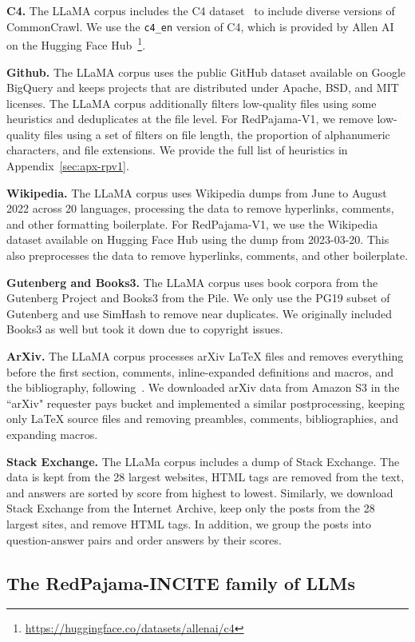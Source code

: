 \documentclass{article}
\begin{document}
{\bf C4.} The LLaMA corpus includes the C4 dataset~\cite{raffel2020exploring} to include diverse versions of CommonCrawl. We use the \texttt{c4\_en} version of C4, which is provided by Allen AI on the Hugging Face Hub~\footnote{\url{https://huggingface.co/datasets/allenai/c4}}.

{\bf Github.} The LLaMA corpus uses the public GitHub dataset available on Google BigQuery and keeps projects that are distributed under Apache, BSD, and MIT licenses. The LLaMA corpus additionally filters low-quality files using some heuristics and deduplicates at the file level. 
For RedPajama-V1, we remove low-quality files using a set of filters on file length, the proportion of alphanumeric characters, and file extensions. We provide the full list of heuristics in Appendix~\ref{sec:apx-rpv1}.

{\bf Wikipedia.} The LLaMA corpus uses Wikipedia dumps from June to August 2022 across 20 languages, processing the data to remove hyperlinks, comments, and other formatting boilerplate.
For RedPajama-V1, we use the Wikipedia dataset available on Hugging Face Hub using the dump from 2023-03-20. This also preprocesses the data to remove hyperlinks, comments, and other boilerplate.

{\bf Gutenberg and Books3.}
The LLaMA corpus uses book corpora from the Gutenberg Project and Books3 from the Pile.
We only use the PG19 subset of Gutenberg and use SimHash to remove near duplicates.
We originally included Books3 as well but took it down due to copyright issues.

{\bf ArXiv.} The LLaMA corpus processes arXiv LaTeX files and removes everything before the first section, comments, inline-expanded definitions and macros, and the bibliography, following~\cite{lewkowycz2022solving}.
We downloaded arXiv data from Amazon S3 in the ``arXiv" requester pays bucket and implemented a similar postprocessing, keeping only LaTeX source files and removing preambles, comments, bibliographies, and expanding macros.

{\bf Stack Exchange.}
The LLaMa corpus includes a dump of Stack Exchange. The data is kept from the 28 largest websites, HTML tags are removed from the text, and answers are sorted by score from highest to lowest.
Similarly, we download Stack Exchange from the Internet Archive, keep only the posts from the 28 largest sites, and remove HTML tags.
In addition, we group the posts into question-answer pairs and order answers by their scores.

\subsection{The RedPajama-INCITE family of LLMs}
\label{sec:rpv1_incite}
\end{document}
